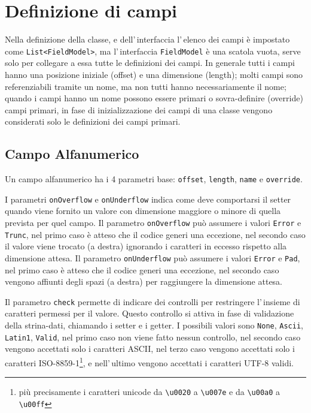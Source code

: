 \documentclass[a4paper,10pt]{report}
\begin{document}
\section{Definizione di campi}
Nella definizione della classe, e dell'\,interfaccia l'\,elenco dei campi è
impostato come \verb!List<FieldModel>!, ma l'\,interfaccia \verb!FieldModel! è
una scatola vuota, serve solo per collegare a essa tutte le definizioni dei
campi. In generale tutti i campi hanno una posizione iniziale (offset) e una
dimensione (length); molti campi sono referenziabili tramite un nome, 
ma non tutti hanno necessariamente il nome; quando i campi hanno un nome
possono essere primari o sovra-definire (override) campi primari, in fase di 
inizializzazione dei campi di una classe vengono considerati solo le definizioni
dei campi primari.

\subsection{Campo Alfanumerico}
Un campo alfanumerico ha i 4 parametri base: \verb!offset!, \verb!length!,
\verb!name! e \verb!override!.

I parametri \verb!onOverflow! e \verb!onUnderflow! indica come deve comportarsi
il setter quando viene fornito un valore con dimensione maggiore o minore di
quella prevista per quel campo.
Il parametro \hypertarget{abc:ovf}{\texttt{onOverflow}} può assumere i valori 
\verb!Error! e \verb!Trunc!, nel primo caso è atteso che il codice generi una 
eccezione, nel secondo caso il valore viene trocato (a destra) ignorando i 
caratteri in eccesso rispetto alla dimensione attesa.
Il parametro \hypertarget{abc:unf}{\texttt{onUnderflow}} può assumere i valori 
\verb!Error! e \verb!Pad!, nel primo caso è atteso che il codice generi una 
eccezione, nel secondo caso vengono affiunti degli spazi (a destra) per 
raggiungere la dimensione attesa.

Il parametro \hypertarget{abc:chk}{\texttt{check}} permette di indicare dei 
controlli per restringere l'\,insieme di caratteri permessi per il valore. 
Questo controllo si attiva in fase di validazione della strina-dati, chiamando 
i setter e i getter.
I possibili valori sono \verb!None!, \verb!Ascii!, \verb!Latin1!, \verb!Valid!,
nel primo caso non viene fatto nessun controllo, nel secondo caso vengono 
accettati solo i caratteri ASCII, nel terzo caso vengono accettati solo i 
caratteri ISO-8859-1\footnote{più precisamente i caratteri unicode da 
\texttt{\textbackslash u0020} a \texttt{\textbackslash u007e} e 
da \texttt{\textbackslash u00a0} a \texttt{\textbackslash u00ff}}, e 
nell'\,ultimo vengono accettati i caratteri UTF-8 validi.
\end{document}
